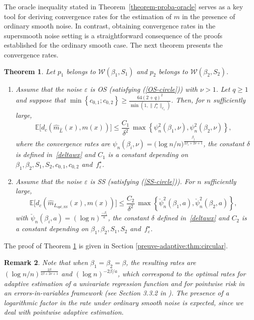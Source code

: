 \documentclass[11pt,a4paper,openany]{article}
\newtheorem{thm}{Theorem}[section]
\newtheorem{remark}[thm]{Remark}
\def\E{\mathbb{E}}
\begin{document}
The oracle inequality stated in Theorem~\ref{theorem-proba-oracle} serves as a key tool for deriving convergence rates for the estimation of $m$ in the presence of ordinary smooth noise. In contrast, obtaining convergence rates in the supersmooth  noise setting is a straightforward consequence of the proofs established for the ordinary smooth case. The next theorem  presents the convergence rates.


\begin{thm} \label{adaptive:thm:circular} 
Let $p_{1}$ belongs to $\mathcal{W}(\beta_{1}, S_{1})$ and $p_{2}$ belongs to $\mathcal{W}(\beta_{2}, S_{2})$. 
\begin{enumerate}
\item Assume that the noise $\varepsilon$ is OS (satisfying (\ref{OS-circle})) with $\nu >1$. Let $q \geq 1$ and suppose that  $\min\left\{c_{0, 1} ; c_{0, 2}\right\} \geq \frac{64 (2 +q)^2 }{\min(1, \| f_{\varepsilon}^\star\|_{\ell_1})}.
$ Then,  %
	for $n$ sufficiently large, 
	\begin{equation*}
		\E \Big[ d_c( \widehat{m}_{\hat L}(x), m(x) )\Big]
		\leq \frac{C_1}{\delta^2}  \,  \max \left\{    \psi_{n}^2(\beta_{1}, \nu) ,  \psi_{n}^2(\beta_{2}, \nu)\right\} , 
	\end{equation*}
	where 
	the convergence rates are     $\psi_{n}(\beta_{i}, \nu) = \big(\log n/n \big)^{\frac{\beta_{j}}{2\beta_{i} + 2\nu +1 }}$, the constant $\delta$ is defined in~\eqref{deltawx} and $C_1$ is a constant depending on $\beta_{1}, \beta_{2}, S_{1}, S_{2},c_{0,1}, c_{0,2}$ and~$f_{\varepsilon}^\star$.
	
\item Assume that the noise $\varepsilon$ is SS  (satisfying (\ref{SS-circle})). For $n$ sufficiently large, 
	\begin{equation*}		\E \Big[ d_c( \widehat m_{L_{opt,SS}}(x), m(x) )\Big]
		\leq \frac{ C_2}{\delta^2}  \,  \max \left\{  \check  \psi_{n}^2(\beta_{1}, a) ,  \check \psi_{n}^2(\beta_{2}, a)\right\} , 
	\end{equation*}
	with $ \check \psi_{n}(\beta_{i}, a) =  \left( {\log n}\right )^{\frac {- \beta_i }{a}} $,  the constant $\delta$ defined in~\eqref{deltawx} and $C_2$ is a constant depending on $\beta_{1}, \beta_{2}, S_{1}, S_{2}$ and~$f_{\varepsilon}^\star$.
	\end{enumerate}
\end{thm}

The proof of Theorem \ref{adaptive:thm:circular} is given in Section \ref{preuve-adaptive:thm:circular}.
\begin{remark}
Note that when $\beta_1 = \beta_2 = \beta$, the resulting rates are $\left(\log n / n\right)^{\frac{2\beta}{2\beta + 2\nu + 1}}$ and $\left(\log n\right)^{-2\beta / a}$, which correspond to the optimal rates for adaptive estimation of a univariate regression function and for pointwise risk in an errors-in-variables framework (see Section 3.3.2 in \cite{Meister}). The presence of a logarithmic factor in the rate under ordinary smooth noise is expected, since we deal with pointwise adaptive estimation.
\end{remark}
\end{document}
